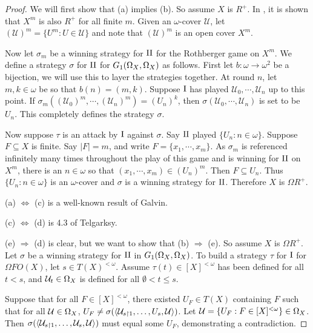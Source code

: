 \documentclass{amsart}
\theoremstyle{plain}
\theoremstyle{definition}
\theoremstyle{remark}
\theoremstyle{plain}
\theoremstyle{definition}
\theoremstyle{remark}
\begin{document}
\begin{proof}
 We will first show that (a) implies (b).
 So assume \(X\) is \(R^+\).
 In \cite{DiasScheepers}, it is shown that \(X^m\) is also \(R^+\) for all finite \(m\).
 Given an \(\omega\)-cover \(\mathcal{U}\), let \((\mathcal{U})^m = \{U^m : U \in \mathcal{U}\}\) and note that \((\mathcal{U})^m\) is an open cover \(X^m\).
 
 Now let \(\sigma_m\) be a winning strategy for \(\mathrm{II}\) for the Rothberger game on \(X^m\).
 We define a strategy \(\sigma\) for \(\mathrm{II}\) for \(G_{1}(\Omega_X,\Omega_X)\) as follows.
 First let \(b:\omega \to \omega^2\) be a bijection, we will use this to layer the strategies together.
 At round \(n\), let \(m,k \in \omega\) be so that \(b(n) = (m,k)\).
 Suppose \(\mathrm{I}\) has played \(\mathcal{U}_0,\cdots,\mathcal{U}_n\) up to this point.
 If \(\sigma_m((\mathcal{U}_0)^m,\cdots,(\mathcal{U}_n)^m) = (U_n)^k\), then \(\sigma(\mathcal{U}_0,\cdots,\mathcal{U}_n)\) is set to be \(U_n\).
 This completely defines the strategy \(\sigma\).
 
 Now suppose \(\tau\) is an attack by \(\mathrm{I}\) against \(\sigma\).
 Say \(\mathrm{II}\) played \(\{U_n : n \in \omega\}\).
 Suppose \(F \subseteq X\) is finite.
 Say \(|F| = m\), and write \(F = \{x_1,\cdots,x_m\}\).
 As \(\sigma_m\) is referenced infinitely many times throughout the play of this game and is winning for \(\mathrm{II}\) on \(X^m\), there is an \(n \in \omega\) so that \((x_1,\cdots,x_m) \in (U_n)^m\).
 Then \(F \subseteq U_n\).
 Thus \(\{U_n : n \in \omega\}\) is an \(\omega\)-cover and \(\sigma\) is a winning strategy for \(\mathrm{II}\).
 Therefore \(X\) is \(\Omega R^+\).

 (a) \(\Leftrightarrow\) (c) is a well-known result of Galvin\cite{Galvin}.

 (c) \(\Leftrightarrow\) (d) is 4.3 of Telgarksy\cite{Telgársky1975}.
  
 (e) \(\Rightarrow\) (d) is clear, but we want to show that (b) \(\Rightarrow\) (e).
 So assume \(X\) is \(\Omega R^+\). 
 Let \(\sigma\) be a winning strategy for \(\mathrm{II}\) in \(G_{1}(\Omega_X,\Omega_X)\). 
 To build a strategy \(\tau\) for \(\mathrm{I}\) for \(\Omega FO(X)\), let \(s\in T(X)^{<\omega}\). 
 Assume \(\tau(t)\in[X]^{<\omega}\) has been defined for all \(t<s\), and \(\mathcal{U}_t\in\Omega_X\) is defined for all \(\emptyset<t\leq s\). 

 Suppose that for all \(F\in[X]^{<\omega}\), there existed \(U_F\in T(X)\) containing \(F\) such that for all \(\mathcal{U}\in\Omega_X\), \(U_F\not=\sigma(\langle\mathcal{U}_{s\restriction 1},\dots,U_s,\mathcal{U}\rangle)\). 
 Let \(\mathcal{U}=\{U_F:F\in[X]^{<\omega}\}\in\Omega_X\). 
 Then \(\sigma(\langle\mathcal{U}_{s\restriction 1},\dots,\mathcal{U}_s,\mathcal{U}\rangle)\) must equal some \(U_F\), demonstrating a contradiction.


\end{proof}
\end{document}
